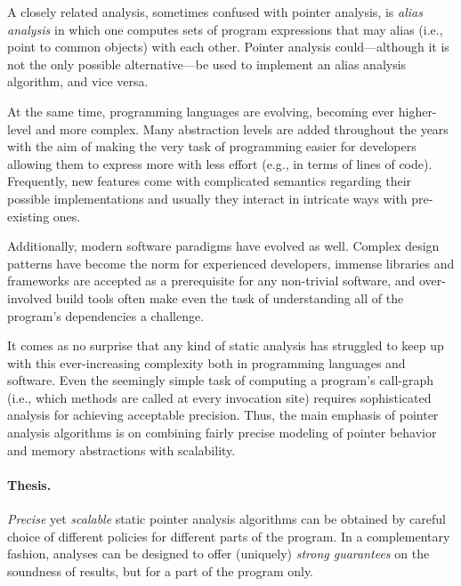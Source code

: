 A closely related analysis, sometimes confused with pointer analysis, is \emph{alias analysis} in which one computes sets of program expressions that may alias (i.e., point to common objects) with each other. Pointer analysis could---although it is not the only possible alternative---be used to implement an alias analysis algorithm, and vice versa.

At the same time, programming languages are evolving, becoming ever higher-level and more complex. Many abstraction levels are added throughout the years with the aim of making the very task of programming easier for developers allowing them to express more with less effort (e.g., in terms of lines of code). Frequently, new features come with complicated semantics regarding their possible implementations and usually they interact in intricate ways with pre-existing ones.

Additionally, modern software paradigms have evolved as well. Complex design patterns have become the norm for experienced developers, immense libraries and frameworks are accepted as a prerequisite for any non-trivial software, and over-involved build tools often make even the task of understanding all of the program's dependencies a challenge.

It comes as no surprise that any kind of static analysis has struggled to keep up with this ever-increasing complexity both in programming languages and software. Even the seemingly simple task of computing a program's call-graph (i.e., which methods are called at every invocation site) requires sophisticated analysis for achieving acceptable precision. Thus, the main emphasis of pointer analysis algorithms is on combining fairly precise modeling of pointer behavior and memory abstractions with scalability.

\paragraph*{Thesis.}
\begin{displayquote}
\emph{Precise} yet \emph{scalable} static pointer analysis algorithms can be obtained by careful choice of different policies for different parts of the program. In a complementary fashion, analyses can be designed to offer (uniquely) \emph{strong guarantees} on the soundness of results, but for a part of the program only.
\end{displayquote}

